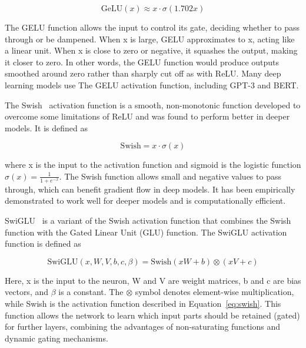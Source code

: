 \begin{equation}
	\text{GeLU}(x) \approx x \cdot \sigma(1.702x)
	\label{eq:geluapprox2}
\end{equation}

The GELU function allows the input to control its gate, deciding whether to pass through or be dampened.
When x is large, GELU approximates to x, acting like a linear unit.
When x is close to zero or negative, it squashes the output, making it closer to zero.
In other words, the GELU function would produce outputs smoothed around zero rather than sharply cut off as with ReLU\@.
Many deep learning models use The GELU activation function, including GPT-3 and BERT\@.

The Swish~\cite{ramachandran2017searching} activation function is a smooth, non-monotonic function developed to overcome some limitations of ReLU and was found to perform better in deeper models.
It is defined as

\begin{equation}
	\text{Swish} = x \cdot \sigma\left(x\right)
	\label{eq:swish}
\end{equation}

\noindent where x is the input to the activation function and sigmoid is the logistic function \(\sigma(x) = \frac{1}{1+e^{-x}}\).
The Swish function allows small and negative values to pass through, which can benefit gradient flow in deep models.
It has been empirically demonstrated to work well for deeper models and is computationally efficient.

SwiGLU~\cite{shazeer2020glu} is a variant of the Swish activation function that combines the Swish function with the Gated Linear Unit (GLU) function.
The SwiGLU activation function is defined as

\begin{equation}
	\text{SwiGLU}\left(x, W, V, b, c, \beta\right) = \text{Swish}\left(xW + b\right) \otimes \left(xV + c\right)
	\label{eq:swiglu}
\end{equation}

\noindent Here, x is the input to the neuron, W and V are weight matrices, b and c are bias vectors, and $\beta$ is a constant.
The $\otimes$ symbol denotes element-wise multiplication, while Swish is the activation function described in Equation~\ref{eq:swish}.
This function allows the network to learn which input parts should be retained (gated) for further layers, combining the advantages of non-saturating functions and dynamic gating mechanisms.

